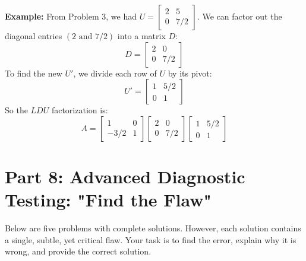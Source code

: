 \documentclass[11pt]{article}
\begin{document}
\textbf{Example:} From Problem 3, we had $U = \begin{bmatrix} 2 & 5 \\ 0 & 7/2 \end{bmatrix}$.
We can factor out the diagonal entries $(2 \text{ and } 7/2)$ into a matrix $D$:
\[ D = \begin{bmatrix} 2 & 0 \\ 0 & 7/2 \end{bmatrix} \]
To find the new $U'$, we divide each row of $U$ by its pivot:
\[ U' = \begin{bmatrix} 1 & 5/2 \\ 0 & 1 \end{bmatrix} \]
So the $LDU$ factorization is:
\[ A = \begin{bmatrix} 1 & 0 \\ -3/2 & 1 \end{bmatrix} \begin{bmatrix} 2 & 0 \\ 0 & 7/2 \end{bmatrix} \begin{bmatrix} 1 & 5/2 \\ 0 & 1 \end{bmatrix} \]

\newpage
\section{Part 8: Advanced Diagnostic Testing: "Find the Flaw"}

Below are five problems with complete solutions. However, each solution contains a single, subtle, yet critical flaw. Your task is to find the error, explain why it is wrong, and provide the correct solution.
\end{document}
